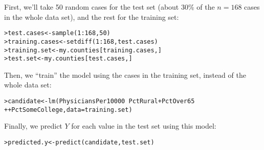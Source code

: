 \documentclass{beamer}\usepackage[]{graphicx}\usepackage[]{color}
\makeatletter
\newcommand{\hlnum}[1]{\textcolor[rgb]{0.824,0.412,0.118}{#1}}%
\newcommand{\hlopt}[1]{\textcolor[rgb]{1,0.894,0.769}{#1}}%
\newcommand{\hlstd}[1]{\textcolor[rgb]{1,0.894,0.769}{#1}}%
\newcommand{\hlkwb}[1]{\textcolor[rgb]{0.804,0.776,0.451}{#1}}%
\newcommand{\hlkwc}[1]{\textcolor[rgb]{0.78,0.941,0.545}{#1}}%
\newcommand{\hlkwd}[1]{\textcolor[rgb]{1,0.78,0.769}{#1}}%
\newenvironment{kframe}{%
 \def\at@end@of@kframe{}%
 \ifinner\ifhmode%
  \def\at@end@of@kframe{\end{minipage}}%
  \begin{minipage}{\columnwidth}%
 \fi\fi%
 \def\FrameCommand##1{\hskip\@totalleftmargin \hskip-\fboxsep
 \colorbox{shadecolor}{##1}\hskip-\fboxsep
     \hskip-\linewidth \hskip-\@totalleftmargin \hskip\columnwidth}%
 \MakeFramed {\advance\hsize-\width
   \@totalleftmargin\z@ \linewidth\hsize
   \@setminipage}}%
 {\par\unskip\endMakeFramed%
 \at@end@of@kframe}
\newenvironment{knitrout}{}{} %
\makeatother
\begin{document}
\begin{darkframes}
    \begin{frame}[fragile]
      \fontsm
      First, we'll take 50 random cases for the test set (about 30\% of the $n=168$ cases in the whole data set), and the rest for the training set:
\begin{knitrout}
\begin{kframe}
\begin{alltt}
\hlstd{> }\hlstd{test.cases} \hlkwb{<-} \hlkwd{sample}\hlstd{(}\hlnum{1}\hlopt{:}\hlnum{168}\hlstd{,} \hlnum{50}\hlstd{)}
\hlstd{> }\hlstd{training.cases} \hlkwb{<-} \hlkwd{setdiff}\hlstd{(}\hlnum{1}\hlopt{:}\hlnum{168}\hlstd{, test.cases)}
\hlstd{> }\hlstd{training.set} \hlkwb{<-} \hlstd{my.counties[training.cases,]}
\hlstd{> }\hlstd{test.set} \hlkwb{<-} \hlstd{my.counties[test.cases,]}
\end{alltt}
\end{kframe}
\end{knitrout}

      \pause

      Then, we ``train'' the model using the cases in the \alert{training} set, instead of the whole data set:
\begin{knitrout}
\begin{kframe}
\begin{alltt}
\hlstd{> }\hlstd{candidate} \hlkwb{<-} \hlkwd{lm}\hlstd{(PhysiciansPer10000} \hlopt{~} \hlstd{PctRural} \hlopt{+} \hlstd{PctOver65}
\hlstd{+ }                  \hlopt{+} \hlstd{PctSomeCollege,} \hlkwc{data}\hlstd{=training.set)}
\end{alltt}
\end{kframe}
\end{knitrout}
    \end{frame}

    \begin{frame}[fragile]
      Finally, we predict $Y$ for each value in the \alert{test} set using this model:
\begin{knitrout}
\begin{kframe}
\begin{alltt}
\hlstd{> }\hlstd{predicted.y} \hlkwb{<-} \hlkwd{predict}\hlstd{(candidate, test.set)}
\end{alltt}
\end{kframe}
\end{knitrout}

      \pause


\end{frame}
\end{darkframes}
\end{document}
